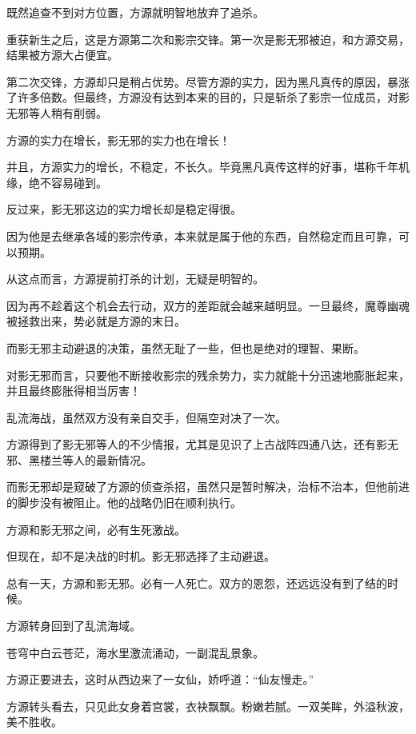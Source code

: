 
\begin{this_body}

既然追查不到对方位置，方源就明智地放弃了追杀。

重获新生之后，这是方源第二次和影宗交锋。第一次是影无邪被迫，和方源交易，结果被方源大占便宜。

第二次交锋，方源却只是稍占优势。尽管方源的实力，因为黑凡真传的原因，暴涨了许多倍数。但最终，方源没有达到本来的目的，只是斩杀了影宗一位成员，对影无邪等人稍有削弱。

方源的实力在增长，影无邪的实力也在增长！

并且，方源实力的增长，不稳定，不长久。毕竟黑凡真传这样的好事，堪称千年机缘，绝不容易碰到。

反过来，影无邪这边的实力增长却是稳定得很。

因为他是去继承各域的影宗传承，本来就是属于他的东西，自然稳定而且可靠，可以预期。

从这点而言，方源提前打杀的计划，无疑是明智的。

因为再不趁着这个机会去行动，双方的差距就会越来越明显。一旦最终，魔尊幽魂被拯救出来，势必就是方源的末日。

而影无邪主动避退的决策，虽然无耻了一些，但也是绝对的理智、果断。

对影无邪而言，只要他不断接收影宗的残余势力，实力就能十分迅速地膨胀起来，并且最终膨胀得相当厉害！

乱流海战，虽然双方没有亲自交手，但隔空对决了一次。

方源得到了影无邪等人的不少情报，尤其是见识了上古战阵四通八达，还有影无邪、黑楼兰等人的最新情况。

而影无邪却是窥破了方源的侦查杀招，虽然只是暂时解决，治标不治本，但他前进的脚步没有被阻止。他的战略仍旧在顺利执行。

方源和影无邪之间，必有生死激战。

但现在，却不是决战的时机。影无邪选择了主动避退。

总有一天，方源和影无邪。必有一人死亡。双方的恩怨，还远远没有到了结的时候。

方源转身回到了乱流海域。

苍穹中白云苍茫，海水里激流涌动，一副混乱景象。

方源正要进去，这时从西边来了一女仙，娇呼道：“仙友慢走。”

方源转头看去，只见此女身着宫裳，衣袂飘飘。粉嫩若腻。一双美眸，外溢秋波，美不胜收。


\end{this_body}
